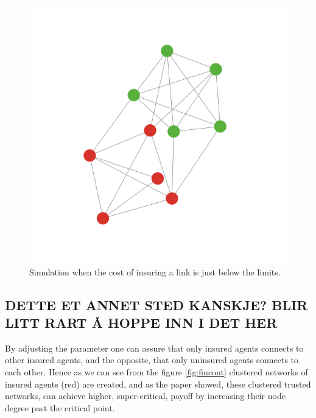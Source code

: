 \begin{figure}[h]
\centering
  \includegraphics[width=0.8\linewidth]{../Figures/BonusGameViolating.png}
  \caption{\label{fig:bonusviolating} Simulation when the cost of insuring a link is just below the limits. }
\end{figure}

\subsection{DETTE ET ANNET STED KANSKJE? BLIR LITT RART Å HOPPE INN I DET HER}
By adjusting the parameter one can assure that only insured agents connects to other insured agents, and the opposite,
that only uninsured agents connects to each other. Hence as we can see from the figure \ref{fig:fincont} clustered
networks of insured agents (red) are created, and  as the paper \cite{contagion} showed, these clustered trusted
networks, can achieve higher, super-critical, payoff by increasing their node degree past the critical point.

